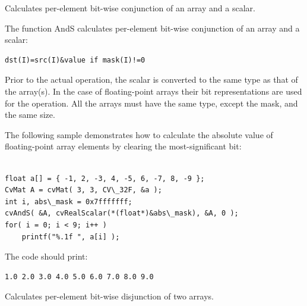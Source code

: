 Calculates per-element bit-wise conjunction of an array and a scalar.


\begin{description}
\end{description}

The function AndS calculates per-element bit-wise conjunction of an array and a scalar:

\begin{lstlisting}
dst(I)=src(I)&value if mask(I)!=0
\end{lstlisting}

Prior to the actual operation, the scalar is converted to the same type as that of the array(s). In the case of floating-point arrays their bit representations are used for the operation. All the arrays must have the same type, except the mask, and the same size.

The following sample demonstrates how to calculate the absolute value of floating-point array elements by clearing the most-significant bit:

\begin{lstlisting}

float a[] = { -1, 2, -3, 4, -5, 6, -7, 8, -9 };
CvMat A = cvMat( 3, 3, CV\_32F, &a );
int i, abs\_mask = 0x7fffffff;
cvAndS( &A, cvRealScalar(*(float*)&abs\_mask), &A, 0 );
for( i = 0; i < 9; i++ )
    printf("%.1f ", a[i] );

\end{lstlisting}

The code should print:

\begin{lstlisting}
1.0 2.0 3.0 4.0 5.0 6.0 7.0 8.0 9.0
\end{lstlisting}


\label{Or}

Calculates per-element bit-wise disjunction of two arrays.


